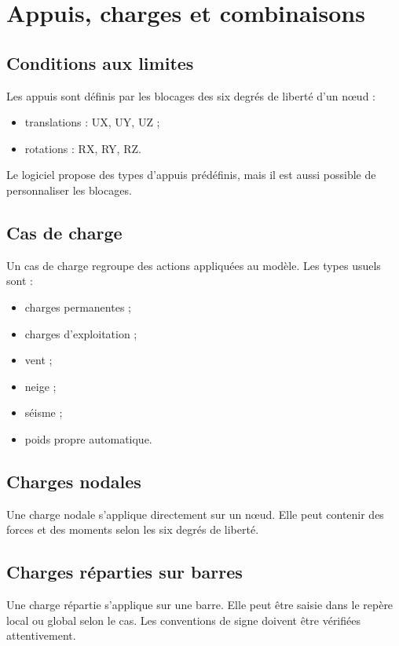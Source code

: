 \chapter{Appuis, charges et combinaisons}

\section{Conditions aux limites}

Les appuis sont définis par les blocages des six degrés de liberté d'un nœud :

\begin{itemize}
  \item translations : UX, UY, UZ ;
  \item rotations : RX, RY, RZ.
\end{itemize}

Le logiciel propose des types d'appuis prédéfinis, mais il est aussi possible
de personnaliser les blocages.

\section{Cas de charge}

Un cas de charge regroupe des actions appliquées au modèle. Les types usuels
sont :

\begin{itemize}
  \item charges permanentes ;
  \item charges d'exploitation ;
  \item vent ;
  \item neige ;
  \item séisme ;
  \item poids propre automatique.
\end{itemize}

\section{Charges nodales}

Une charge nodale s'applique directement sur un nœud. Elle peut contenir des
forces et des moments selon les six degrés de liberté.

\section{Charges réparties sur barres}

Une charge répartie s'applique sur une barre. Elle peut être saisie dans le
repère local ou global selon le cas. Les conventions de signe doivent être
vérifiées attentivement.

